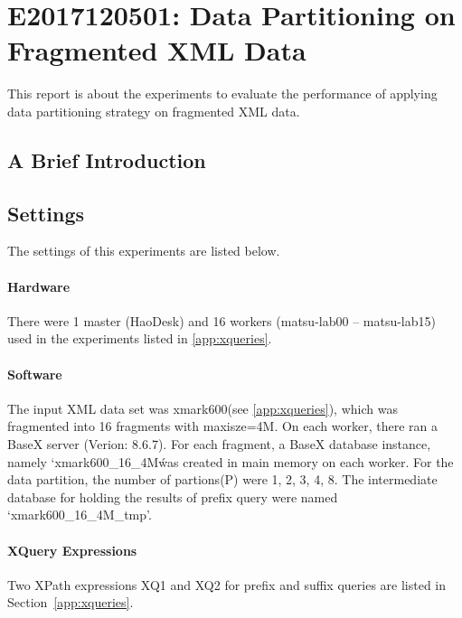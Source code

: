 

\section{E2017120501: Data Partitioning on Fragmented XML Data}

This report is about the experiments to evaluate the performance 
of applying data partitioning strategy on fragmented XML data. 


\subsection{A Brief Introduction}



\subsection{Settings}

The settings of this experiments are listed below.

\paragraph{Hardware}

There were 1 master (HaoDesk) and 16 workers (matsu-lab00 -- matsu-lab15) 
used in the experiments listed in \ref{app:xqueries}.



\paragraph{Software}
The input XML data set was xmark600(see \ref{app:xqueries}), which 
was fragmented into 16 fragments with maxisze=4M.
On each worker, there ran a BaseX server (Verion: 8.6.7). 
For each fragment, a BaseX database instance, namely `xmark600\_16\_4M\'
was created in main memory on each worker.
For the data partition, the number of partions(P) were  1, 2, 3, 4, 8.
The intermediate database for holding the results of prefix
query were named  `xmark600\_16\_4M\_tmp'.
 

\paragraph{XQuery Expressions}

Two XPath expressions XQ1 and XQ2 for prefix and suffix queries 
are listed in Section~\ref{app:xqueries}.



